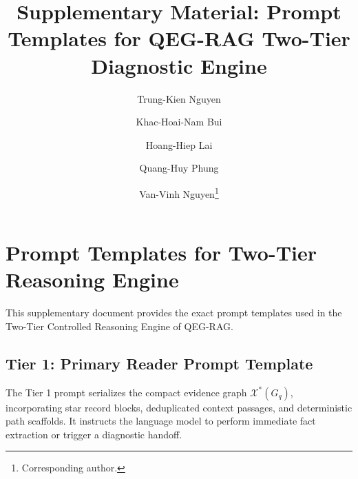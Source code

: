 \documentclass[runningheads]{llncs}
\begin{document}
\title{Supplementary Material: Prompt Templates for QEG-RAG Two-Tier Diagnostic Engine}
\author{Trung-Kien Nguyen \and
Khac-Hoai-Nam Bui \and
Hoang-Hiep Lai \and
Quang-Huy Phung \and
Van-Vinh Nguyen\thanks{Corresponding author.}}
\maketitle

\appendix
\section{Prompt Templates for Two-Tier Reasoning Engine}
\label{sec:prompt_templates}

This supplementary document provides the exact prompt templates used in the Two-Tier Controlled Reasoning Engine of QEG-RAG.

\subsection{Tier 1: Primary Reader Prompt Template}
The Tier 1 prompt serializes the compact evidence graph $\mathcal{X}^*(G_q)$, incorporating star record blocks, deduplicated context passages, and deterministic path scaffolds. It instructs the language model to perform immediate fact extraction or trigger a diagnostic handoff.
\end{document}
